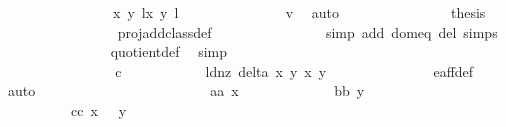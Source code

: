 \begin{isabellebody}
\ \ \ \ \ \ \ \ \ \ \ \ \ \ \ \ {\isacharbraceleft}{\isacharparenleft}{\isacharparenleft}{\isacharparenleft}x{\isacharcomma}\ y{\isacharparenright}{\isacharcomma}\ l{\isacharparenright}{\isacharcomma}{\isacharparenleft}{\isacharparenleft}x{\isacharprime}{\isacharcomma}\ y{\isacharprime}{\isacharparenright}{\isacharcomma}\ l{\isacharprime}{\isacharparenright}{\isacharparenright}{\isacharbraceright}{\isachardoublequoteclose}\ \isanewline
\ \ \ \ \ \ \ \ \ \ \ \ \isamarkupfalse%
\ v{}\ \isamarkupfalse%
\ auto\isanewline
\ \ \ \ \ \ \ \ \ \ \ \ \isamarkupfalse%
\ \isamarkupfalse%
\ {\isacharquery}thesis\ \isanewline
\ \ \ \ \ \ \ \ \ \ \ \ \ \ \isamarkupfalse%
\ {}\ proj{\isacharunderscore}add{\isacharunderscore}class{\isacharunderscore}def\ \isanewline
\ \ \ \ \ \ \ \ \ \ \ \ \ \ \isamarkupfalse%
{\isacharparenleft}simp\ add{\isacharcolon}\ dom{\isacharunderscore}eq\ del{\isacharcolon}\ {\isasymtau}{\isachardot}simps{\isacharparenright}\isanewline
\ \ \ \ \ \ \ \ \ \ \ \ \ \ \isamarkupfalse%
\ quotient{\isacharunderscore}def\ \isamarkupfalse%
\ simp\isanewline
\ \ \ \ \ \ \ \ \ \ \isamarkupfalse%
\isanewline
\ \ \ \ \ \ \ \ \isamarkupfalse%
\isanewline
\ \ \ \ \ \ \isamarkupfalse%
\ \ \ \ \ \ \ \isanewline
\ \ \ \ \ \ \isamarkupfalse%
\isanewline
\ \ \ \ \ \ \ \ \isamarkupfalse%
\ c\isanewline
\ \ \ \ \ \ \ \ \isamarkupfalse%
\ \isamarkupfalse%
\ ld{\isacharunderscore}nz{\isacharcolon}\ {\isachardoublequoteopen}delta{\isacharprime}\ x\ y\ x{\isacharprime}\ y{\isacharprime}\ {\isasymnoteq}\ {}{\isachardoublequoteclose}\ \isanewline
\ \ \ \ \ \ \ \ \ \ \isamarkupfalse%
\ e{\isacharunderscore}aff{\isacharunderscore}{}{\isacharunderscore}def\ \isamarkupfalse%
\ auto\ \ \ \ \isanewline
\ \ \ \ \ \ \ \ \isamarkupfalse%
\ \isanewline
\ \ \ \ \ \ \ \ \ \ {\isacharparenleft}aa{\isacharparenright}\ {\isachardoublequoteopen}x{\isacharprime}\ {\isacharequal}\ {}{\isachardoublequoteclose}\ {\isacharbar}\isanewline
\ \ \ \ \ \ \ \ \ \ {\isacharparenleft}bb{\isacharparenright}\ {\isachardoublequoteopen}y{\isacharprime}\ {\isacharequal}\ {}{\isachardoublequoteclose}\ {\isacharbar}\isanewline
\ \ \ \ \ \ \ \ \ \ {\isacharparenleft}cc{\isacharparenright}\ {\isachardoublequoteopen}x{\isacharprime}\ {\isasymnoteq}\ {}{\isachardoublequoteclose}\ {\isachardoublequoteopen}y{\isacharprime}\ {\isasymnoteq}\ {}{\isachardoublequoteclose}\ \isamarkupfalse%

\end{isabellebody}
